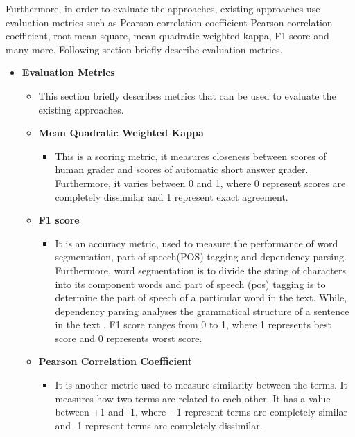 \documentclass{article}
\begin{document}
\begin{itemize}
 Furthermore, in order to evaluate the approaches, existing approaches use evaluation metrics such as Pearson correlation coefficient Pearson correlation coefficient, root mean square, mean quadratic weighted kappa, F1 score and many more. Following section briefly describe evaluation metrics.   	

\begin{itemize}

\item \textbf{Evaluation Metrics}
	\begin{itemize}
	\item This section briefly describes metrics that can be used to evaluate the existing approaches.
	\end{itemize}

	\begin{itemize}
	\item \textbf{Mean Quadratic Weighted Kappa}
		\begin{itemize}
		\item This is a scoring metric, it measures closeness between scores of human grader and scores of automatic short answer grader. Furthermore, it varies between 0 and 1, where 0 represent scores are completely dissimilar and 1 represent exact agreement.\cite{kappa}
		\end{itemize}
	\item \textbf{F1 score}
		\begin{itemize}
		\item It is an accuracy metric, used to measure the performance of word segmentation, part of speech(POS) tagging and dependency parsing\cite{NLPUnderstanding}. Furthermore, word segmentation is to divide the string of characters into its component words and part of speech (pos) tagging is to determine the part of speech of a particular word in the text. While, dependency parsing analyses the grammatical structure of a sentence in the text \cite{dependencyParser}. F1 score ranges from 0 to 1, where 1 represents best score and 0 represents worst score. 
		\end{itemize}
	\item \textbf{Pearson Correlation Coefficient}
		\begin{itemize}
		\item It is another metric used to measure similarity between the terms. It measures how two terms are related to each other. It has a value between +1 and -1, where +1 represent terms are completely similar and -1 represent terms are completely dissimilar.\cite{wikiPearson}

\end{itemize}
\end{itemize}
\end{itemize}
\end{itemize}
\end{document}
